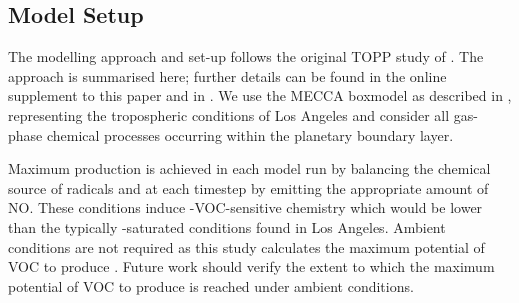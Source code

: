\subsection{Model Setup} \label{ss:model_setup}
%
The modelling approach and set-up follows the original TOPP study of \citet{Butler:2011}.
The approach is summarised here; further details can be found in the online supplement to this paper and in \citet{Butler:2011}. 
We use the MECCA boxmodel \citep{Sander:2005} as described in \citet{Butler:2011}, representing the tropospheric conditions of Los Angeles and consider all gas-phase chemical processes occurring within the planetary boundary layer.

Maximum  production is achieved in each model run by balancing the chemical source of radicals and  at each timestep by emitting the appropriate amount of NO.
These  conditions induce -VOC-sensitive chemistry which would be lower than the typically -saturated conditions found in Los Angeles.
Ambient  conditions are not required as this study calculates the maximum potential of VOC to produce .
Future work should verify the extent to which the maximum potential of VOC to produce  is reached under ambient  conditions.

